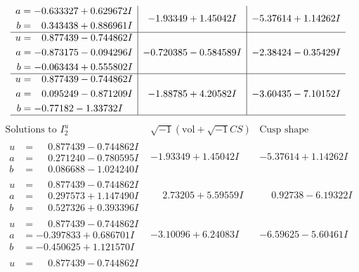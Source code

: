 \documentclass[1p]{elsarticle_modified}
\theoremstyle{definition}
\newcommand{\I}{\sqrt{-1}}
\begin{document}
$$\begin{array}{c|c|c}
\begin{aligned}
a &= -0.633327 + 0.629672 I \\
b &= \phantom{-}0.343438 + 0.886961 I\end{aligned}
 & -1.93349 + 1.45042 I & -5.37614 + 1.14262 I \\ \hline\begin{aligned}
u &= \phantom{-}0.877439 - 0.744862 I \\
a &= -0.873175 - 0.094296 I \\
b &= -0.063434 + 0.555802 I\end{aligned}
 & -0.720385 - 0.584589 I & -2.38424 - 0.35429 I \\ \hline\begin{aligned}
u &= \phantom{-}0.877439 - 0.744862 I \\
a &= \phantom{-}0.095249 - 0.871209 I \\
b &= -0.77182 - 1.33732 I\end{aligned}
 & -1.88785 + 4.20582 I & -3.60435 - 7.10152 I\\
 \hline 
 \end{array}$$\newpage$$\begin{array}{c|c|c}  
\text{Solutions to }I^u_{2}& \I (\text{vol} + \sqrt{-1}CS) & \text{Cusp shape}\\
 \hline 
\begin{aligned}
u &= \phantom{-}0.877439 - 0.744862 I \\
a &= \phantom{-}0.271240 - 0.780595 I \\
b &= \phantom{-}0.086688 - 1.024240 I\end{aligned}
 & -1.93349 + 1.45042 I & -5.37614 + 1.14262 I \\ \hline\begin{aligned}
u &= \phantom{-}0.877439 - 0.744862 I \\
a &= \phantom{-}0.297573 + 1.147490 I \\
b &= \phantom{-}0.527326 + 0.393396 I\end{aligned}
 & \phantom{-}2.73205 + 5.59559 I & \phantom{-}0.92738 - 6.19322 I \\ \hline\begin{aligned}
u &= \phantom{-}0.877439 - 0.744862 I \\
a &= -0.397833 + 0.686701 I \\
b &= -0.450625 + 1.121570 I\end{aligned}
 & -3.10096 + 6.24083 I & -6.59625 - 5.60461 I \\ \hline\begin{aligned}
u &= \phantom{-}0.877439 - 0.744862 I \\

\end{aligned}
\end{array}$$
\end{document}
